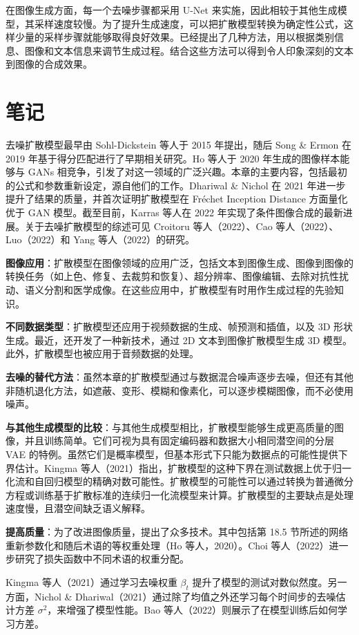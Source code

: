 \documentclass[lang=cn,newtx,10pt,scheme=chinese]{elegantbook}
\begin{document}
在图像生成方面，每一个去噪步骤都采用 U-Net 来实施，因此相较于其他生成模型，其采样速度较慢。为了提升生成速度，可以把扩散模型转换为确定性公式，这样少量的采样步骤就能够取得良好效果。已经提出了几种方法，用以根据类别信息、图像和文本信息来调节生成过程。结合这些方法可以得到令人印象深刻的文本到图像的合成效果。

\section{笔记}
去噪扩散模型最早由 Sohl-Dickstein 等人于 2015 年提出，随后 Song \& Ermon 在 2019 年基于得分匹配进行了早期相关研究。Ho 等人于 2020 年生成的图像样本能够与 GANs 相竞争，引发了对这一领域的广泛兴趣。本章的主要内容，包括最初的公式和参数重新设定，源自他们的工作。Dhariwal \& Nichol 在 2021 年进一步提升了结果的质量，并首次证明扩散模型在 Fréchet Inception Distance 方面量化优于 GAN 模型。截至目前，Karras 等人在 2022 年实现了条件图像合成的最新进展。关于去噪扩散模型的综述可见 Croitoru 等人（2022）、Cao 等人（2022）、Luo（2022）和 Yang 等人（2022）的研究。

\textbf{图像应用}：扩散模型在图像领域的应用广泛，包括文本到图像生成、图像到图像的转换任务（如上色、修复、去裁剪和恢复）、超分辨率、图像编辑、去除对抗性扰动、语义分割和医学成像。在这些应用中，扩散模型有时用作生成过程的先验知识。

\textbf{不同数据类型}：扩散模型还应用于视频数据的生成、帧预测和插值，以及 3D 形状生成。最近，还开发了一种新技术，通过 2D 文本到图像扩散模型生成 3D 模型。此外，扩散模型也被应用于音频数据的处理。

\textbf{去噪的替代方法}：虽然本章的扩散模型通过与数据混合噪声逐步去噪，但还有其他非随机退化方法，如遮蔽、变形、模糊和像素化，可以逐步模糊图像，而不必使用噪声。

\textbf{与其他生成模型的比较}：与其他生成模型相比，扩散模型能够生成更高质量的图像，并且训练简单。它们可视为具有固定编码器和数据大小相同潜空间的分层 VAE 的特例。虽然它们是概率模型，但基本形式下只能为数据点的可能性提供下界估计。Kingma 等人（2021）指出，扩散模型的这种下界在测试数据上优于归一化流和自回归模型的精确对数可能性。扩散模型的可能性可以通过转换为普通微分方程或训练基于扩散标准的连续归一化流模型来计算。扩散模型的主要缺点是处理速度慢，且潜空间缺乏语义解释。

\textbf{提高质量}：为了改进图像质量，提出了众多技术。其中包括第 18.5 节所述的网络重新参数化和随后术语的等权重处理（Ho 等人，2020）。Choi 等人（2022）进一步研究了损失函数中不同术语的权重分配。

Kingma 等人（2021）通过学习去噪权重 \(\beta_t\) 提升了模型的测试对数似然度。另一方面，Nichol \& Dhariwal（2021）通过除了均值之外还学习每个时间步的去噪估计方差 \(\sigma^2\)，来增强了模型性能。Bao 等人（2022）则展示了在模型训练后如何学习方差。
\end{document}
